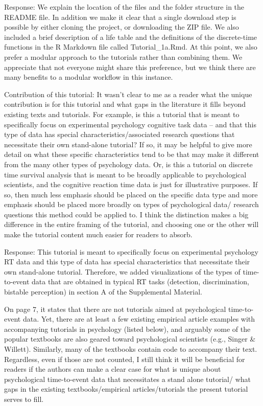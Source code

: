\documentclass[
]{article}
\renewenvironment{quote}{\begin{leftbar}}{\end{leftbar}}
\begin{document}
Response: We explain the location of the files and the folder structure
in the README file. In addition we make it clear that a single download
step is possible by either cloning the project, or downloading the ZIP
file. We also included a brief description of a life table and the
definitions of the discrete-time functions in the R Markdown file called
Tutorial\_1a.Rmd. At this point, we also prefer a modular approach to
the tutorials rather than combining them. We appreciate that not
everyone might share this preference, but we think there are many
benefits to a modular workflow in this instance.

\begin{quote}
Contribution of this tutorial: It wasn't clear to me as a reader what
the unique contribution is for this tutorial and what gaps in the
literature it fills beyond existing texts and tutorials. For example, is
this a tutorial that is meant to specifically focus on experimental
psychology cognitive task data -- and that this type of data has special
characteristics/associated research questions that necessitate their own
stand-alone tutorial? If so, it may be helpful to give more detail on
what these specific characteristics tend to be that may make it
different from the many other types of psychology data. Or, is this a
tutorial on discrete time survival analysis that is meant to be broadly
applicable to psychological scientists, and the cognitive reaction time
data is just for illustrative purposes. If so, then much less emphasis
should be placed on the specific data type and more emphasis should be
placed more broadly on types of psychological data/ research questions
this method could be applied to. I think the distinction makes a big
difference in the entire framing of the tutorial, and choosing one or
the other will make the tutorial content much easier for readers to
absorb.
\end{quote}

Response: This tutorial is meant to specifically focus on experimental
psychology RT data and this type of data has special characteristics
that necessitate their own stand-alone tutorial. Therefore, we added
visualizations of the types of time-to-event data that are obtained in
typical RT tasks (detection, discrimination, bistable perception) in
section A of the Supplemental Material.

\begin{quote}
On page 7, it states that there are not tutorials aimed at psychological
time-to-event data. Yet, there are at least a few existing empirical
article examples with accompanying tutorials in psychology (listed
below), and arguably some of the popular textbooks are also geared
toward psychological scientists (e.g., Singer \& Willett). Similarly,
many of the textbooks contain code to accompany their text. Regardless,
even if those are not counted, I still think it will be beneficial for
readers if the authors can make a clear case for what is unique about
psychological time-to-event data that necessitates a stand alone
tutorial/ what gaps in the existing textbooks/empirical
articles/tutorials the present tutorial serves to fill.
\end{quote}
\end{document}
